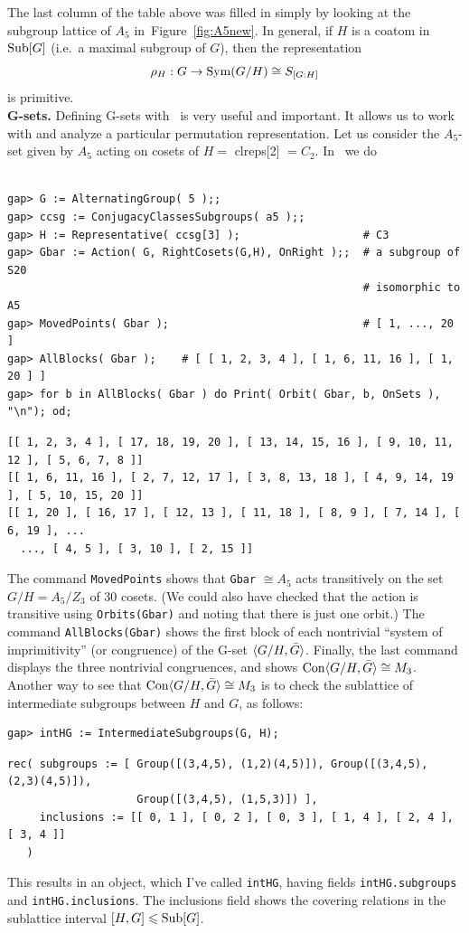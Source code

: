 The last column of the table above was filled in simply 
by looking at the subgroup lattice of $A_5$ in~Figure~\ref{fig:A5new}.  
In general, if $H$ is a coatom in $\operatorname{Sub}[G]$ (i.e.~a maximal subgroup of $G$),
then the representation  
\[
\rho_{H} : G \rightarrow \operatorname{Sym}(G/H) \cong S_{[G:H]}
\] is primitive.
\\[10pt]
{\bf G-sets.} Defining G-sets with \gap\ is very useful and important.  It allows us to work
with and analyze a particular permutation representation.  Let us consider the
$A_5$-set given by $A_5$ acting on cosets of $H=$ {clreps[2]} $=C_2$. In \gap\
we do
{\codesize 
\begin{verbatim}

gap> G := AlternatingGroup( 5 );;
gap> ccsg := ConjugacyClassesSubgroups( a5 );;
gap> H := Representative( ccsg[3] );                   # C3
gap> Gbar := Action( G, RightCosets(G,H), OnRight );;  # a subgroup of S20 
                                                       # isomorphic to A5
gap> MovedPoints( Gbar );                              # [ 1, ..., 20 ]
gap> AllBlocks( Gbar );    # [ [ 1, 2, 3, 4 ], [ 1, 6, 11, 16 ], [ 1, 20 ] ]
gap> for b in AllBlocks( Gbar ) do Print( Orbit( Gbar, b, OnSets ), "\n"); od;
\end{verbatim}}
{\scriptsize 
\begin{verbatim}
[[ 1, 2, 3, 4 ], [ 17, 18, 19, 20 ], [ 13, 14, 15, 16 ], [ 9, 10, 11, 12 ], [ 5, 6, 7, 8 ]]
[[ 1, 6, 11, 16 ], [ 2, 7, 12, 17 ], [ 3, 8, 13, 18 ], [ 4, 9, 14, 19 ], [ 5, 10, 15, 20 ]]
[[ 1, 20 ], [ 16, 17 ], [ 12, 13 ], [ 11, 18 ], [ 8, 9 ], [ 7, 14 ], [ 6, 19 ], ...
  ..., [ 4, 5 ], [ 3, 10 ], [ 2, 15 ]]

\end{verbatim}}
\noindent The command {\tt MovedPoints} shows that {\tt Gbar} $\cong A_5$ acts transitively on the set
$G/H = A_5/Z_3$ of 30 cosets.  (We could also have checked that the action is transitive
using {\tt Orbits(Gbar)} and noting that there is just one orbit.)
The command {\tt AllBlocks(Gbar)} shows 
the first block of each nontrivial ``system of imprimitivity'' (or congruence) of
the G-set $\langle G/H, \bar{G}\rangle$.  Finally, the last command displays the three
nontrivial congruences, and shows $\operatorname{Con} \langle G/H, \bar{G}\rangle\cong M_3$.  Another way
to see that  $\operatorname{Con} \langle G/H, \bar{G}\rangle\cong M_3$ is to check the sublattice of
intermediate subgroups between $H$ and $G$, as follows:
{\codesize 
\begin{verbatim}
gap> intHG := IntermediateSubgroups(G, H);
\end{verbatim}}
{\codesize
\begin{verbatim}
rec( subgroups := [ Group([(3,4,5), (1,2)(4,5)]), Group([(3,4,5), (2,3)(4,5)]), 
                    Group([(3,4,5), (1,5,3)]) ], 
     inclusions := [[ 0, 1 ], [ 0, 2 ], [ 0, 3 ], [ 1, 4 ], [ 2, 4 ], [ 3, 4 ]] 
   )
\end{verbatim}}
\noindent This results in an object, which I've called {\tt intHG}, having fields
{\tt intHG.subgroups} and {\tt intHG.inclusions}.  The inclusions field shows
the covering relations in the sublattice interval $[H, G] \leqslant \operatorname{Sub}[G]$.

